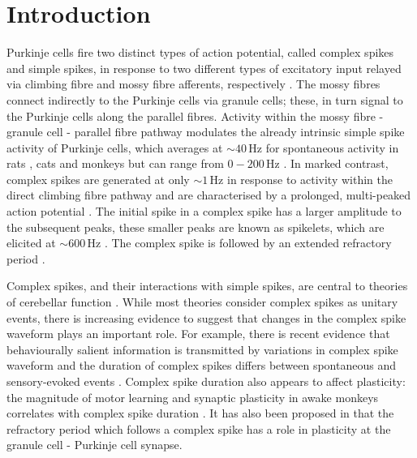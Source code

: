 \documentclass[twocolumn]{svjour3}          %
\newcommand{\hz}{\,\mathrm{Hz}}
\begin{document}
\section{Introduction}

Purkinje cells fire two distinct types of action potential, called
complex spikes and simple spikes, in response to two different types
of excitatory input relayed via climbing fibre and mossy fibre
afferents, respectively
\citep{PalayChanPalay1974,ito1984cerebellum,eccles2013cerebellum}. The
mossy fibres connect indirectly to the Purkinje cells via granule
cells; these, in turn signal to the Purkinje cells along the parallel
fibres. Activity within the mossy fibre - granule cell - parallel
fibre pathway modulates the already intrinsic simple spike activity of
Purkinje cells, which averages at $\sim 40\hz$ for spontaneous
activity in rats \citep{ArmstrongRawson1979}, cats
\citep{thach1967somatosensory} and monkeys \citep{fu1997relationship}
but can range from $0-200\hz$ \citep{chen2016cerebellum}. In marked
contrast, complex spikes are generated at only $\sim 1\hz$
\citep{lang1999patterns} in response to activity within the direct
climbing fibre pathway and are characterised by a prolonged,
multi-peaked action potential \citep{CampbellHesslow1986}. The initial
spike in a complex spike has a larger amplitude to the subsequent
peaks, these smaller peaks are known as spikelets, which are elicited
at $\sim 600\hz$ \citep{WarnaarEtAl2015,BurroughsEtAl2016}. The
complex spike is followed by an extended refractory period
\citep{VoogdGlickstein1998,EcclesLlinasSasaki1966,Fujita1968}.

Complex spikes, and their interactions with simple spikes, are central
to theories of cerebellar function
\citep{CampbellHesslow1986,eccles2013cerebellum,ito1984cerebellum,ito2011cerebellum,YangLispberger2014}.
While most theories consider complex spikes as unitary events, there
is increasing evidence to suggest that changes in the complex spike
waveform plays an important role. For example, there is recent
evidence that behaviourally salient information is transmitted by
variations in complex spike waveform and the duration of complex
spikes differs between spontaneous and sensory-evoked events
\citep{MarutaEtAl2007,NajafiMedina2013}. Complex spike duration also
appears to affect plasticity: the magnitude of motor learning and
synaptic plasticity in awake monkeys correlates with complex spike
duration \citep{YangLispberger2014}. It has also been proposed in
\citet{Houghton2014} that the refractory period which follows a
complex spike has a role in plasticity at the granule cell - Purkinje
cell synapse.
\end{document}
